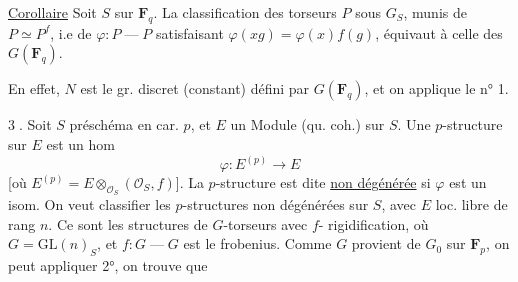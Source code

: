 \uline{Corollaire} Soit $S$ sur $\mathbf F_q$. La classification des
torseurs $P$ sous $G_S$, munis de $P\simeq P^f$, i.e
de $\varphi:P\mathbin{\text{---}}P$ satisfaisant $\varphi(xg)=\varphi(x)f(g)$, équivaut
à celle des 
$G(\mathbf F_q)$.

En effet, $N$ est le gr. discret  (constant)
défini par $G(\mathbf F_q)$, et on applique le n° 1.

\textcircled{3}. Soit $S$ préschéma en car. $p$, et $E$ un
Module (qu. coh.) sur $S$. Une $p$-structure sur $E$
est un hom
\[
\varphi:E^{(p)}\longrightarrow E
\]
[où $E^{(p)}=E\otimes_{\mathcal O_S}(\mathcal O_S,f)$]. La $p$-structure est
dite \uline{non dégénérée} si $\varphi$ est un isom.
On veut classifier les $p$-structures non
dégénérées sur $S$, avec $E$ loc. libre de rang $n$.
Ce sont les structures de $G$-torseurs avec $f$-
rigidification, où $G=\mathrm{GL}(n)_S$, et $f:G\mathbin{\text{---}}G$
est le frobenius. Comme $G$ provient de
$G_0$ sur $\mathbf F_p$, on peut appliquer 2°, on trouve que
